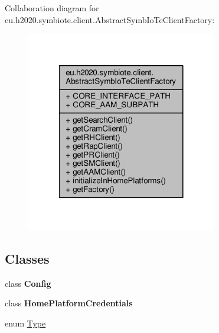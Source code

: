 Collaboration diagram for eu.\+h2020.\+symbiote.\+client.\+Abstract\+Symb\+Io\+Te\+Client\+Factory\+:\nopagebreak
\begin{figure}[H]
\begin{center}
\leavevmode
\includegraphics[width=236pt]{classeu_1_1h2020_1_1symbiote_1_1client_1_1AbstractSymbIoTeClientFactory__coll__graph}
\end{center}
\end{figure}
\subsection*{Classes}
\begin{DoxyCompactItemize}
\item 
class {\bfseries Config}
\item 
class {\bfseries Home\+Platform\+Credentials}
\item 
enum \hyperlink{enumeu_1_1h2020_1_1symbiote_1_1client_1_1AbstractSymbIoTeClientFactory_1_1Type}{Type}
\end{DoxyCompactItemize}
